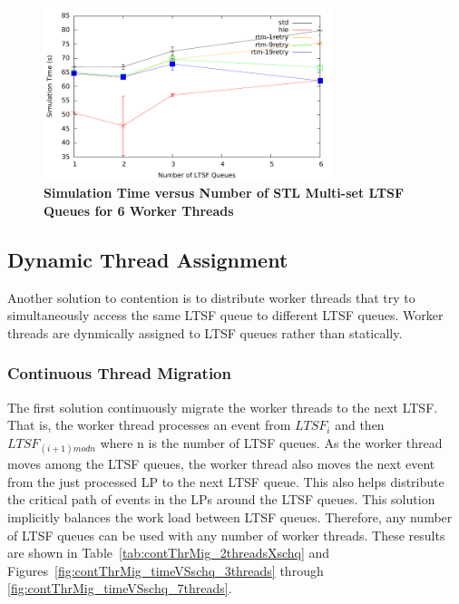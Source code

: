 \documentclass[11pt]{book}
\begin{document}
\begin{figure}
    \centering
    \graphicspath{ {./figures/} }
    \includegraphics[width=0.75\textwidth,keepaspectratio]{hugeepidemicsim-NOmig-timeVSschedQs-multiset-6thread}
    \caption{\textbf{Simulation Time versus Number of STL Multi-set LTSF Queues for 6
        Worker Threads}}\label{fig:noThrMig_timeVSschq_6threads}
\end{figure}

\subsection{Dynamic Thread Assignment}

Another solution to contention is to distribute worker threads that try to simultaneously
access the same LTSF queue to different LTSF queues.  Worker threads are dynmically
assigned to LTSF queues rather than statically.

\subsubsection{Continuous Thread Migration}

The first solution continuously migrate the worker threads to the next LTSF.  That is, the
worker thread processes an event from $LTSF_i$ and then $LTSF_{(i+1)mod n}$ where n is the
number of LTSF queues.  As the worker thread moves among the LTSF queues, the worker
thread also moves the next event from the just processed LP to the next LTSF queue.  This
also helps distribute the critical path of events in the LPs around the LTSF queues.  This
solution implicitly balances the work load between LTSF queues.  Therefore, any number of
LTSF queues can be used with any number of worker threads.  These results are shown in
Table~\ref{tab:contThrMig_2threadsXschq} and
Figures~\ref{fig:contThrMig_timeVSschq_3threads} through
\ref{fig:contThrMig_timeVSschq_7threads}.
\end{document}
